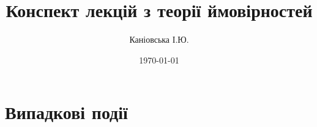 \documentclass{report}
\author{Каніовська І.Ю.}
\title{Конспект лекцій з теорії ймовірностей}
\date{\today}
\begin{document}
 
    \maketitle
    \tableofcontents
    \chapter{Випадкові події}
        
        
        
\end{document}
